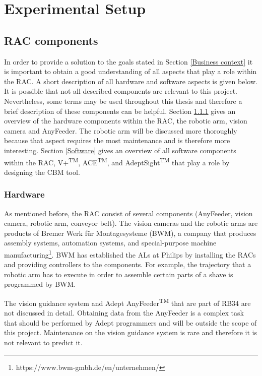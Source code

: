 \chapter{Experimental Setup} \label{Chapter4}

\section{RAC components} \label{RAC components}
In order to provide a solution to the goals stated in Section \ref{Business context} it is important to obtain a good understanding of all aspects that play a role within the RAC. A short description of all hardware and software aspects is given below. It is possible that not all described components are relevant to this project. Nevertheless, some terms may be used throughout this thesis and therefore a brief description of these components can be helpful. Section \ref{Hardware} gives an overview of the hardware components within the RAC, the robotic arm, vision camera and AnyFeeder. The robotic arm will be discussed more thoroughly because that aspect requires the most maintenance and is therefore more interesting. Section \ref{Software} gives an overview of all software components within the RAC, V+\textsuperscript{\tiny{TM}}, ACE\textsuperscript{\tiny{TM}}, and AdeptSight\textsuperscript{\tiny{TM}} that play a role by designing the CBM tool.

\subsection{Hardware} \label{Hardware}
As mentioned before, the RAC consist of several components (AnyFeeder, vision camera, robotic arm, conveyor belt). The vision cameras and the robotic arms are products of Bremer Werk für Montagesysteme (BWM), a company that produces assembly systems, automation systems, and special-purpose machine manufacturing\footnote{https://www.bwm-gmbh.de/en/unternehmen/}. BWM has established the ALs at Philips by installing the RACs and providing controllers to the components. For example, the trajectory that a robotic arm has to execute in order to assemble certain parts of a shave is programmed by BWM. 

The vision guidance system and Adept AnyFeeder\textsuperscript{\tiny{TM}} that are part of RB34 are not discussed in detail. Obtaining data from the AnyFeeder is a complex task that should be performed by Adept programmers and will be outside the scope of this project. Maintenance on the vision guidance system is rare and therefore it is not relevant to predict it.  


